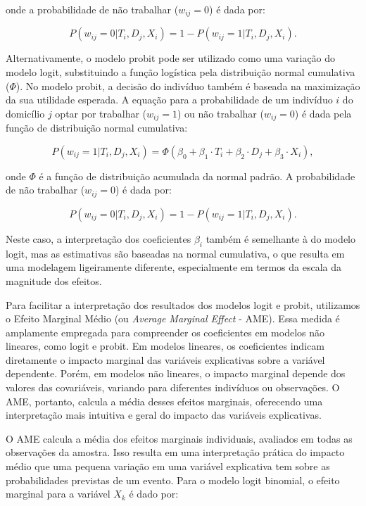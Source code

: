 \documentclass[12pt]{article}
\theoremstyle{break}
\begin{document}
onde a probabilidade de não trabalhar (\(w_{ij} = 0\)) é dada por:

\[
P(w_{ij} = 0 | T_i, D_j, X_i) = 1 - P(w_{ij} = 1 | T_i, D_j, X_i).
\]

Alternativamente, o modelo probit pode ser utilizado como uma variação do modelo logit, substituindo a função logística pela distribuição normal cumulativa (\(\Phi\)). No modelo probit, a decisão do indivíduo também é baseada na maximização da sua utilidade esperada. A equação para a probabilidade de um indivíduo \(i\) do domicílio \(j\) optar por trabalhar (\(w_{ij} = 1\)) ou não trabalhar (\(w_{ij} = 0\)) é dada pela função de distribuição normal cumulativa:

\[
P(w_{ij} = 1 | T_i, D_j, X_i) = \Phi\left( \beta_0 + \beta_1 \cdot T_i + \beta_2 \cdot D_j + \beta_3 \cdot X_i \right),
\]

onde \(\Phi\) é a função de distribuição acumulada da normal padrão. A probabilidade de não trabalhar (\(w_{ij} = 0\)) é dada por:

\[
P(w_{ij} = 0 | T_i, D_j, X_i) = 1 - P(w_{ij} = 1 | T_i, D_j, X_i).
\]

Neste caso, a interpretação dos coeficientes \(\beta_i\) também é semelhante à do modelo logit, mas as estimativas são baseadas na normal cumulativa, o que resulta em uma modelagem ligeiramente diferente, especialmente em termos da escala da magnitude dos efeitos.

Para facilitar a interpretação dos resultados dos modelos logit e probit, utilizamos o Efeito Marginal Médio (ou \textit{Average Marginal Effect} - AME). Essa medida é amplamente empregada para compreender os coeficientes em modelos não lineares, como logit e probit. Em modelos lineares, os coeficientes indicam diretamente o impacto marginal das variáveis explicativas sobre a variável dependente. Porém, em modelos não lineares, o impacto marginal depende dos valores das covariáveis, variando para diferentes indivíduos ou observações. O AME, portanto, calcula a média desses efeitos marginais, oferecendo uma interpretação mais intuitiva e geral do impacto das variáveis explicativas.

O AME calcula a média dos efeitos marginais individuais, avaliados em todas as observações da amostra. Isso resulta em uma interpretação prática do impacto médio que uma pequena variação em uma variável explicativa tem sobre as probabilidades previstas de um evento. Para o modelo logit binomial, o efeito marginal para a variável \(X_k\) é dado por:
\end{document}
